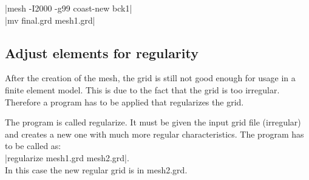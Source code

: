         |mesh -I2000 -g99 coast-new bck1|\\
        |mv final.grd mesh1.grd|\\

\subsection{Adjust elements for regularity}

After the creation of the mesh, the grid is still not good enough
for usage in a finite element model. This is due to the fact that
the grid is too irregular. Therefore a program has to be applied
that regularizes the grid.

The program is called regularize. It must be given the input grid file
(irregular) and creates a new one with much more regular characteristics.
The program has to be called as:\\

        |regularize mesh1.grd mesh2.grd|.\\

In this case the new regular grid is in mesh2.grd.

